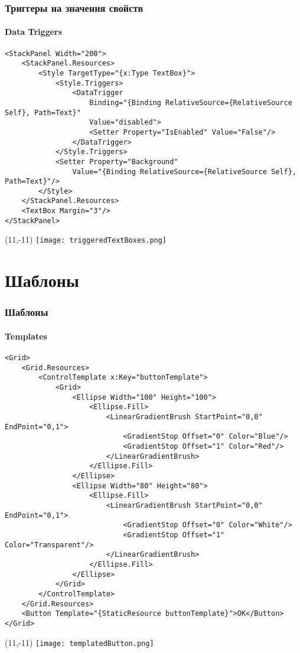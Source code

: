 \documentclass[xetex,mathserif,serif]{beamer}
\begin{document}
	\begin{frame}[fragile]
		\frametitle{Триггеры на значения свойств}
		\framesubtitle{Data Triggers}
		\begin{scriptsize}
			\begin{verbatim}
<StackPanel Width="200">
    <StackPanel.Resources>
        <Style TargetType="{x:Type TextBox}">
            <Style.Triggers>
                <DataTrigger
                    Binding="{Binding RelativeSource={RelativeSource Self}, Path=Text}"
                    Value="disabled">
                    <Setter Property="IsEnabled" Value="False"/>
                </DataTrigger>
            </Style.Triggers>
            <Setter Property="Background"
                Value="{Binding RelativeSource={RelativeSource Self}, Path=Text}"/>
        </Style>
    </StackPanel.Resources>
    <TextBox Margin="3"/>
</StackPanel>
			\end{verbatim}
		\end{scriptsize}
		\begin{textblock}{4}(11,-11)
			\texttt{[image: triggeredTextBoxes.png]}
		\end{textblock}
	\end{frame}

	\section{Шаблоны}

	\begin{frame}[fragile]
		\frametitle{Шаблоны}
		\framesubtitle{Templates}
		\begin{ssmall}
			\begin{verbatim}
<Grid>
    <Grid.Resources>
        <ControlTemplate x:Key="buttonTemplate">
            <Grid>
                <Ellipse Width="100" Height="100">
                    <Ellipse.Fill>
                        <LinearGradientBrush StartPoint="0,0" EndPoint="0,1">
                            <GradientStop Offset="0" Color="Blue"/>
                            <GradientStop Offset="1" Color="Red"/>
                        </LinearGradientBrush>
                    </Ellipse.Fill>
                </Ellipse>
                <Ellipse Width="80" Height="80">
                    <Ellipse.Fill>
                        <LinearGradientBrush StartPoint="0,0" EndPoint="0,1">
                            <GradientStop Offset="0" Color="White"/>
                            <GradientStop Offset="1" Color="Transparent"/>
                        </LinearGradientBrush>
                    </Ellipse.Fill>
                </Ellipse>
            </Grid>
        </ControlTemplate>
    </Grid.Resources>
    <Button Template="{StaticResource buttonTemplate}">OK</Button>
</Grid>
			\end{verbatim}
		\end{ssmall}
		\begin{textblock}{2}(11,-11)
			\texttt{[image: templatedButton.png]}
		\end{textblock}
	\end{frame}
\end{document}
